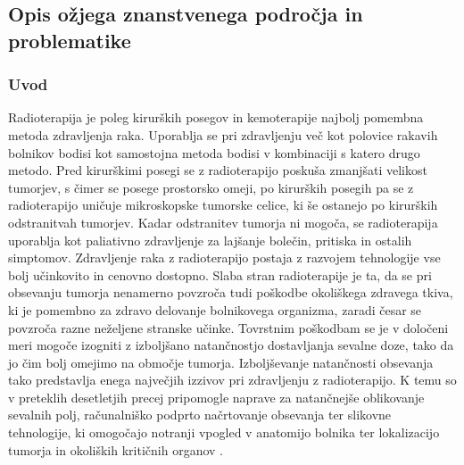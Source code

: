 \documentclass[a4paper,twoside,11pt]{article}
\begin{document}
	\subsection{Opis ožjega znanstvenega področja in problematike}
	\subsubsection*{Uvod}
	\par{
	  Radioterapija je poleg kirurških posegov in kemoterapije najbolj pomembna metoda zdravljenja raka. Uporablja se pri zdravljenju več kot polovice rakavih bolnikov bodisi kot samostojna metoda bodisi v kombinaciji s katero drugo metodo. Pred kirurškimi posegi se z radioterapijo poskuša zmanjšati velikost tumorjev, s čimer se posege prostorsko omeji, po kirurških posegih pa se z radioterapijo uničuje mikroskopske tumorske celice, ki še ostanejo po kirurških odstranitvah tumorjev. Kadar odstranitev tumorja ni mogoča, se radioterapija uporablja kot paliativno zdravljenje za lajšanje bolečin, pritiska in ostalih simptomov. Zdravljenje raka z radioterapijo postaja z razvojem tehnologije vse bolj učinkovito in cenovno dostopno. Slaba stran radioterapije je ta, da se pri obsevanju tumorja nenamerno povzroča tudi poškodbe okoliškega zdravega tkiva, ki je pomembno za zdravo delovanje bolnikovega organizma, zaradi česar se povzroča razne neželjene stranske učinke. Tovrstnim poškodbam se je v določeni meri mogoče izogniti z izboljšano natančnostjo dostavljanja sevalne doze, tako da jo čim bolj omejimo na območje tumorja. Izboljševanje natančnosti obsevanja tako predstavlja enega največjih izzivov pri zdravljenju z radioterapijo. K temu so v preteklih desetletjih precej pripomogle naprave za natančnejše oblikovanje sevalnih polj, računalniško podprto načrtovanje obsevanja ter slikovne tehnologije, ki omogočajo notranji vpogled v anatomijo bolnika ter lokalizacijo tumorja in okoliških kritičnih organov \citep{baskar2012,jaffray2012}.
	} %
\end{document}
